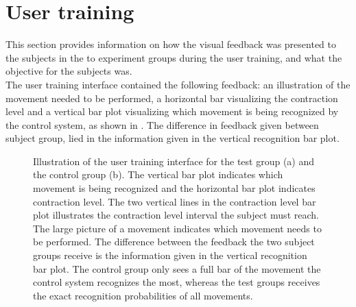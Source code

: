 
\section{User training} \label{sec:M:usertraining}
This section provides information on how the visual feedback was presented to the subjects in the to experiment groups during the user training, and what the objective for the subjects was. \\
The user training interface contained the following feedback: an illustration of the movement needed to be performed, a horizontal bar visualizing the contraction level and a vertical bar plot visualizing which movement is being recognized by the control system, as shown in . The difference in feedback given between subject group, lied in the information given in the vertical recognition bar plot.

\begin{figure}[H] 
\centering
	\caption{Illustration of the user training interface for the test group (a) and the control group (b). The vertical bar plot indicates which movement is being recognized and the horizontal bar plot indicates contraction level. The two vertical lines in the contraction level bar plot illustrates the contraction level interval the subject must reach. The large picture of a movement indicates which movement needs to be performed. The difference between the feedback the two subject groups receive is the information given in the vertical recognition bar plot. The control group only sees a full bar of the movement the control system recognizes the most, whereas the test groups receives the exact recognition probabilities of all movements.}
    \label{fig:feedbackGUI}
\end{figure}

